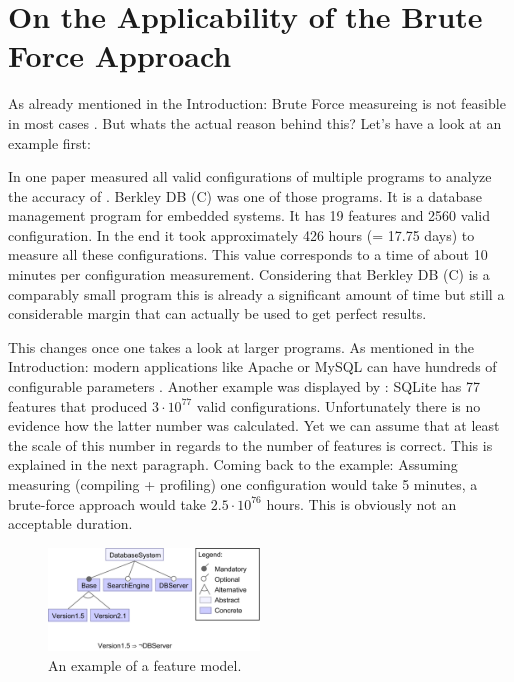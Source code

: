 \section{On the Applicability of the Brute Force Approach}
\label{sec:BruteForce}
As already mentioned in the Introduction: Brute Force measureing is not feasible in most cases \cite{AutomatedFeatureDetectionSiegmund2012}. But whats the actual reason behind this?
Let's have a look at an example first:

In one paper \citet{AutomatedFeatureDetectionSiegmund2012} measured all valid configurations of multiple programs to analyze the accuracy of \AFID. Berkley DB (C) was one of those programs. It is a database management program for embedded systems. It has 19 features and 2560 valid configuration. In the end it took approximately 426 hours (= 17.75 days) to measure all these configurations. This value corresponds to a time of about 10 minutes per configuration measurement. Considering that Berkley DB (C) is a comparably small program this is already a significant amount of time but still a considerable margin that can actually be used to get perfect results.

This changes once one takes a look at larger programs. As mentioned in the Introduction: modern applications like Apache or MySQL can have hundreds of configurable parameters \cite{YouveGivenMeTooManyKnobs}. Another example was displayed by \citet{VAMOSConference}: SQLite has 77 features that produced $3 \cdot 10^{77}$ valid configurations. Unfortunately there is no evidence how the latter number was calculated. Yet we can assume that at least the scale of this number in regards to the number of features is correct. This is explained in the next paragraph. Coming back to the example: Assuming measuring (compiling + profiling) one configuration would take 5 minutes, a brute-force approach would take $2.5 \cdot 10^76$ hours. This is obviously not an acceptable duration.

\begin{figure}
	\includegraphics[width = 0.5\textwidth]{presentation/figures/FeatureModel}
	\captionsetup{width=0.95\linewidth}
	\caption{An example of a feature model.}
	\label{fig:FeatureModel}
\end{figure}

